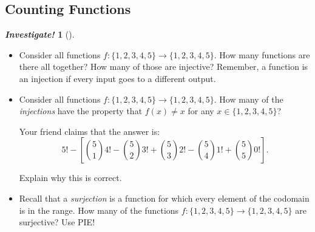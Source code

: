\documentclass[10pt,]{book}
\theoremstyle{plain}
\theoremstyle{definition}
\theoremstyle{definition}
\newtheorem{investigation}[project]{\emph{Investigate!}}
\theoremstyle{definition}
\numberwithin{equation}{section}
\begin{document}
\subsection[Counting Functions]{Counting Functions}\label{subsection-20}
\begin{investigation}[]\label{investigation-13}

    \leavevmode%
\begin{itemize}[label=\textbullet]
\item{}
    Consider all functions \(f: \{1,2,3,4,5\} \to \{1,2,3,4,5\}\). How many functions are there all together? How many of those are injective? Remember, a function is an injection if every input goes to a different output.
\item{}
    Consider all functions \(f: \{1,2,3,4,5\} \to \{1,2,3,4,5\}\). How many of the \emph{injections} have the property that \(f(x) \ne x\) for any \(x \in \{1,2,3,4,5\}\)?
\par

    Your friend claims that the answer is:
    \begin{equation*}
      5! - \left[ {5\choose 1}4! - {5 \choose 2}3! + {5\choose 3}2! - {5 \choose 4}1! + {5\choose 5}0! \right].
    \end{equation*}
\par

    Explain why this is correct.
\item{}
    Recall that a \emph{surjection} is a function for which every element of the codomain is in the range. How many of the functions \(f: \{1,2,3,4,5\} \to \{1,2,3,4,5\}\) are surjective? Use PIE!
\end{itemize}

\end{investigation}
\end{document}
